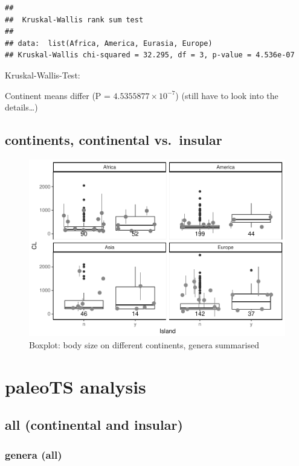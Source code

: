 \documentclass[]{article}
\begin{document}
\begin{verbatim}
## 
##  Kruskal-Wallis rank sum test
## 
## data:  list(Africa, America, Eurasia, Europe)
## Kruskal-Wallis chi-squared = 32.295, df = 3, p-value = 4.536e-07
\end{verbatim}

Kruskal-Wallis-Test:

Continent means differ (P = \(4.5355877\times 10^{-7}\)) (still have to
look into the details\ldots{})

\newpage

\subsection{continents, continental
vs.~insular}\label{continents-continental-vs.insular}

\begin{figure}[htbp]
\centering
\includegraphics{MA_JJ_files/figure-latex/BPConCI-1.pdf}
\caption{Boxplot: body size on different continents, genera summarised}
\end{figure}

\newpage

\section{paleoTS analysis}\label{paleots-analysis}

\subsection{all (continental and
insular)}\label{all-continental-and-insular}

\subsubsection{genera (all)}\label{genera-all}
\end{document}
